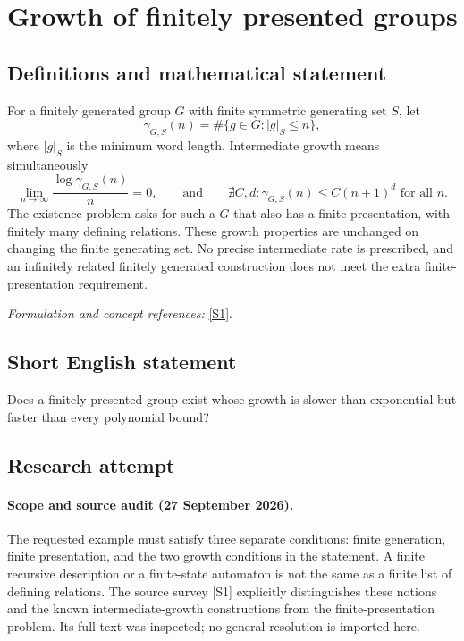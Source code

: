 \documentclass[11pt]{article}
\begin{document}
\section*{\texorpdfstring{Growth of finitely presented groups}{Growth of finitely presented groups}}\label{statement}
\subsection{Definitions and mathematical statement}
For a finitely generated group $G$ with finite symmetric generating set $S$, let
\[
 \gamma_{G,S}(n)=\#\{g\in G:|g|_S\le n\},
\]
where $|g|_S$ is the minimum word length. Intermediate growth means simultaneously
\[
 \lim_{n\to\infty}\frac{\log\gamma_{G,S}(n)}n=0,
 \qquad\text{and}\qquad
 \nexists C,d:\gamma_{G,S}(n)\le C(n+1)^d\text{ for all }n.
\]
The existence problem asks for such a $G$ that also has a finite presentation, with finitely many defining relations. These growth properties are unchanged on changing the finite generating set. No precise intermediate rate is prescribed, and an infinitely related finitely generated construction does not meet the extra finite-presentation requirement.
\par\smallskip\textit{Formulation and concept references:} \href{https://ar5iv.labs.arxiv.org/html/1111.0512}{[S1]}.

\subsection{Short English statement}
Does a finitely presented group exist whose growth is slower than exponential but faster than every polynomial bound?
\subsection{Research attempt}
\paragraph{Scope and source audit (27 September 2026).}
The requested example must satisfy three separate conditions: finite
generation, finite presentation, and the two growth conditions in the
statement. A finite recursive description or a finite-state automaton
is not the same as a finite list of defining relations. The source
survey [S1] explicitly distinguishes these notions and the known
intermediate-growth constructions from the finite-presentation problem.
Its full text was inspected; no general resolution is imported here.
\end{document}
